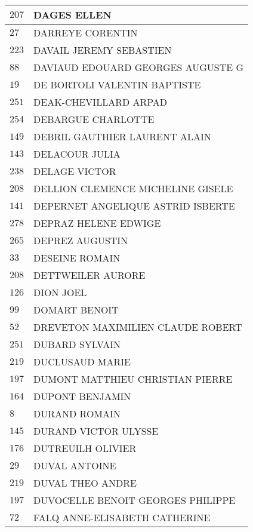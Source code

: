 \begin{xltabular}{\linewidth}{|l|X|}
    \hline
    $207$ & DAGES ELLEN \\
    \hline
    $27$ & DARREYE CORENTIN \\
    \hline
    $223$ & DAVAIL JEREMY SEBASTIEN \\
    \hline
    $88$ & DAVIAUD EDOUARD GEORGES AUGUSTE G \\
    \hline
    $19$ & DE BORTOLI VALENTIN BAPTISTE \\
    \hline
    $251$ & DEAK-CHEVILLARD ARPAD \\
    \hline
    $254$ & DEBARGUE CHARLOTTE \\
    \hline
    $149$ & DEBRIL GAUTHIER LAURENT ALAIN \\
    \hline
    $143$ & DELACOUR JULIA \\
    \hline
    $238$ & DELAGE VICTOR \\
    \hline
    $208$ & DELLION CLEMENCE MICHELINE GISELE \\
    \hline
    $141$ & DEPERNET ANGELIQUE ASTRID ISBERTE \\
    \hline
    $278$ & DEPRAZ HELENE EDWIGE \\
    \hline
    $265$ & DEPREZ AUGUSTIN \\
    \hline
    $33$ & DESEINE ROMAIN \\
    \hline
    $208$ & DETTWEILER AURORE \\
    \hline
    $126$ & DION JOEL \\
    \hline
    $99$ & DOMART BENOIT \\
    \hline
    $52$ & DREVETON MAXIMILIEN CLAUDE ROBERT \\
    \hline
    $251$ & DUBARD SYLVAIN \\
    \hline
    $219$ & DUCLUSAUD MARIE \\
    \hline
    $197$ & DUMONT MATTHIEU CHRISTIAN PIERRE \\
    \hline
    $164$ & DUPONT BENJAMIN \\
    \hline
    $8$ & DURAND ROMAIN \\
    \hline
    $145$ & DURAND VICTOR ULYSSE \\
    \hline
    $176$ & DUTREUILH OLIVIER \\
    \hline
    $29$ & DUVAL ANTOINE \\
    \hline
    $219$ & DUVAL THEO ANDRE \\
    \hline
    $197$ & DUVOCELLE BENOIT GEORGES PHILIPPE \\
    \hline
    $72$ & FALQ ANNE-ELISABETH CATHERINE \\

\end{xltabular}
